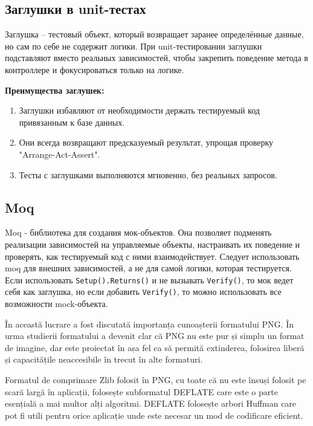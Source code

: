 \documentclass[a4paper,12pt]{report}
\begin{document}
\subsection{Заглушки в unit-тестах}
Заглушка -- тестовый объект, который возвращает заранее определённые данные, 
но сам по себе не содержит логики. При unit-тестировании заглушки подставляют вместо реальных зависимостей, 
чтобы закрепить поведение метода в контроллере и фокусироваться только на логике.

\textbf{Преимущества заглушек:}
\begin{enumerate}
    \item
        Заглушки избавляют от необходимости держать тестируемый код привязанным к базе данных.
    \item
        Они всегда возвращают предсказуемый результат, упрощая проверку "Arrange-Act-Assert".
    \item
        Тесты с заглушками выполняются мгновенно, без реальных запросов.
\end{enumerate}

\subsection{Moq}

Moq - библиотека для создания мок-объектов. Она позволяет подменять реализации зависимостей на управляемые объекты, 
настраивать их поведение и проверять, как тестируемый код с ними взаимодействует. Следует использовать moq для внешних зависимостей, 
а не для самой логики, которая тестируется. Если использовать \texttt{Setup().Returns()} и не вызывать \texttt{Verify()}, то мок ведет себя как заглушка, 
но если добавить \texttt{Verify()}, то можно использовать все возможности mock-объекта. 

    

În această lucrare a fost discutată importanța cunoașterii formatului \ac{PNG}.
În urma studierii formatului a devenit clar că \ac{PNG} nu este pur și simplu un format de imagine,
dar este proiectat în așa fel ca să permită extinderea, folosirea liberă și
capacitățile neaccesibile în trecut în alte formaturi.

Formatul de comprimare Zlib folosit în \ac{PNG},
cu toate că nu este însuși folosit pe scară largă în aplicații,
folosește subformatul DEFLATE care este o parte esențială a mai multor alți algoritmi.
DEFLATE folosește arbori Huffman care pot fi utili pentru orice aplicație
unde este necesar un mod de codificare eficient.
\end{document}

